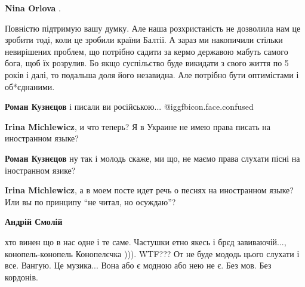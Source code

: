 \begin{itemize}
\begin{itemize}
\textbf{Nina Orlova} .

Повністю підтримую вашу думку. Але наша розхристаність не дозволила нам це
зробити тоді, коли це зробили країни Балтії. А зараз ми накопичили стільки
невирішених проблем, що потрібно садити за кермо державою мабуть самого бога, щоб
їх розрулив. Бо якщо суспільство буде викидати з свого життя по 5 років і
далі, то подальша доля його незавидна. Але потрібно бути оптимістами і
об*єднаними.

\textbf{Роман Кузнєцов} і писали ви російською... @igg{fbicon.face.confused} 

\textbf{Irina Michlewicz}, и что теперь? Я в Украине не имею права писать на иностранном языке?

\textbf{Роман Кузнєцов} ну так і молодь скаже, ми що, не маємо права слухати пісні на іностранном язике?

\textbf{Irina Michlewicz}, а в моем посте идет речь о песнях на иностранном языке? Или вы по принципу \enquote{не читал, но осуждаю}?
\end{itemize} %

\textbf{Андрій Смолій} 

хто винен що в нас одне і те саме. Частушки етно якесь і брєд завиваючій...,
конопель-конопель Конопелєчка ))). WTF??? От не буде мододь цього слухати і
все. Вангую. Це музика... Вона або є модною або нею не є. Без мов. Без кордонів.


\end{itemize} %
